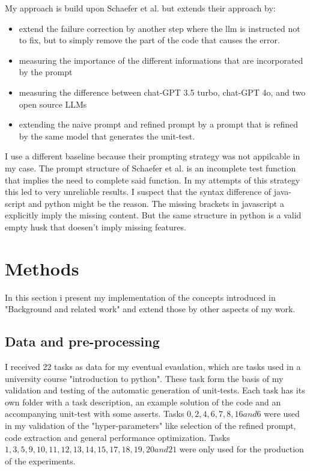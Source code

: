 \documentclass[a4paper,11pt,oneside]{memoir}
\begin{document}
My approach is build upon Schaefer et al. but extends their approach by:
\begin{itemize}
    \item extend the failure correction by another step where the llm is instructed not to fix, but to simply remove the part of the code that causes the error.
    \item measuring the importance of the different informations that are incorporated by the prompt  
    \item measuring the difference between chat-GPT 3.5 turbo, chat-GPT 4o, and two open source LLMs  
    \item extending the naive prompt and refined prompt by a prompt that is refined by the same model that generates the unit-test.
\end{itemize}

I use a different baseline because their prompting strategy was not appilcable in my case.
The prompt structure of Schaefer et al. is an incomplete test function that implies the need to complete said function. In my attempts of this strategy this led to very unreliable results. I suspect that the syntax difference of java-script and python might be the reason. The missing brackets in javascript a explicitly imply the missing content. But the same structure in python is a valid empty husk that doesen't imply missing features.


\chapter{Methods}
\label{Methods}
In this section i present my implementation of the concepts introduced in "Background and related work" and extend those by other aspects of my work.

\section{Data and pre-processing}
I received 22 tasks as data for my eventual evaulation, which are tasks used in a university course "introduction to python". These task form the basis of my validation and testing of the automatic generation of unit-tests. Each task has its own folder with a task description, an example solution of the code and an accompanying unit-test with some asserts. Tasks $0,2,4,6,7,8,16 and 6$ were used in my validation of the "hyper-parameters" like selection of the refined prompt, code extraction and general performance optimization. 
Tasks $1,3,5,9,10,11,12,13, 14, 15, 17, 18, 19, 20 and 21$ were only used for the production of the experiments.
\end{document}
